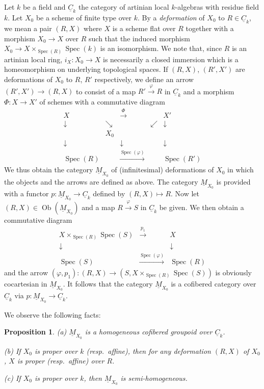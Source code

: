 \documentclass[11pt]{article}
\theoremstyle{plain}
\newtheorem{proposition}[theorem]{Proposition}
\theoremstyle{definition}
\theoremstyle{remark}
\DeclareMathOperator{\Spec}{Spec}
\DeclareMathOperator{\Ob}{Ob}
\begin{document}
Let $k$ be a field and $\underline{C}_k$ the category of artinian local $k$-algebras with residue field $k$. Let $X_0$ be a scheme of finite type over $k$. By a \emph{deformation} of $X_0$ to $R \in \underline{C}_k$, we mean a pair $(R, X)$ where $X$ is a scheme flat over $R$ together with a morphism $X_0 \to X$ over $R$ such that the induced morphism $X_0 \to X \times_{\Spec(R)} \Spec(k)$ is an isomorphism. We note that, since $R$ is an artinian local ring, $i_X : X_0 \to X$ is necessarily a closed immersion which is a homeomorphism on underlying topological spaces. If $(R, X)$, $(R', X')$ are deformations of $X_0$ to $R$, $R'$ respectively, we define an arrow $(R', X') \to (R, X)$ to consist of a map $R' \xrightarrow{\varphi} R$ in $\underline{C}_k$ and a morphism $\Phi : X \to X'$ of schemes with a commutative diagram
\[
\begin{array}{ccccc}
X & & \xrightarrow{\Phi} & & X' \\
\downarrow & \searrow & & \swarrow & \downarrow \\
& X_0 & & & \\
\downarrow & & \downarrow & & \downarrow \\
\Spec(R) & & \xrightarrow{\Spec(\varphi)} & & \Spec(R')
\end{array}
\]
We thus obtain the category $\underline{M}_{X_0}$ of (infinitesimal) deformations of $X_0$ in which the objects and the arrows are defined as above. The category $\underline{M}_{X_0}$ is provided with a functor $p : \underline{M}_{X_0} \to \underline{C}_k$ defined by $(R, X) \mapsto R$. Now let $(R, X) \in \Ob(\underline{M}_{X_0})$ and a map $R \xrightarrow{\varphi} S$ in $\underline{C}_k$ be given. We then obtain a commutative diagram
\[
\begin{array}{ccc}
X \times_{\Spec(R)} \Spec(S) & \xrightarrow{p_1} & X \\
\downarrow & & \downarrow \\
\Spec(S) & \xrightarrow{\Spec(\varphi)} & \Spec(R)
\end{array}
\]
and the arrow $(\varphi, p_1) : (R, X) \to (S, X \times_{\Spec(R)} \Spec(S))$ is obviously cocartesian in $\underline{M}_{X_0}$. It follows that the category $\underline{M}_{X_0}$ is a cofibered category over $\underline{C}_k$ via $p : \underline{M}_{X_0} \to \underline{C}_k$.

We observe the following facts:

\begin{proposition}
\textup{(a)} $\underline{M}_{X_0}$ is a homogeneous cofibered groupoid over $\underline{C}_k$.

\textup{(b)} If $X_0$ is proper over $k$ (resp.\ affine), then for any deformation $(R, X)$ of $X_0$, $X$ is proper (resp.\ affine) over $R$.

\textup{(c)} If $X_0$ is proper over $k$, then $\underline{M}_{X_0}$ is semi-homogeneous.
\end{proposition}
\end{document}
